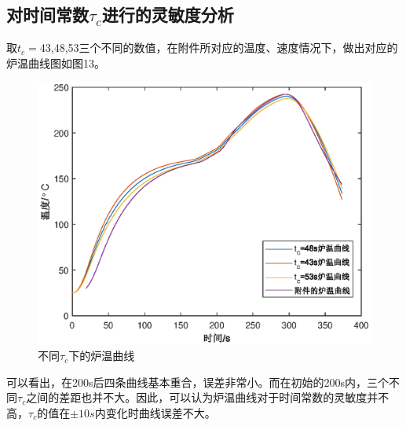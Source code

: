 \documentclass[a4paper,12pt]{ctexart} %
\begin{document}
	\subsection{对时间常数$\tau_c$进行的灵敏度分析}
	取$t_c=$43,48,53三个不同的数值，在附件所对应的温度、速度情况下，做出对应的炉温曲线图如图13。
	\begin{figure}[H]
		\centering
		\includegraphics[scale=0.7]{ex_tc}
		\caption{不同$\tau_c$下的炉温曲线}
	\end{figure}\par
	可以看出，在200s后四条曲线基本重合，误差非常小。而在初始的200s内，三个不同$\tau_c$之间的差距也并不大。因此，可以认为炉温曲线对于时间常数的灵敏度并不高，$\tau_c$的值在$\pm10s$内变化时曲线误差不大。
\end{document}
